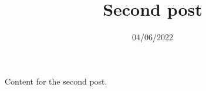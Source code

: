 \documentclass{post}
\title{Second post}
\date{04/06/2022}
\begin{document}
Content for the second post.
\end{document}

